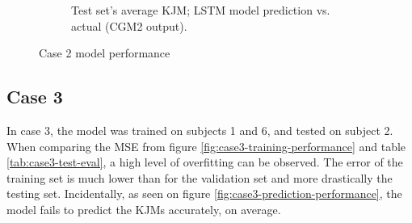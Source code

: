 \documentclass[../main.tex]{subfiles}
\begin{document}
\begin{figure}[!htb]
\begin{subfigure}[b]{0.515\textwidth}
         \label{fig:case2-prediction-performance}
         \caption{Test set's average \ac{KJM}; LSTM model prediction vs. actual (CGM2 output).}
     \end{subfigure}
    \caption{Case 2 model performance}
    \label{fig:case2-performance-plots}
\end{figure}


\subsection{Case 3}
\label{sec:results-case3}
In case 3, the model was trained on subjects 1 and 6, and tested on subject 2.
When comparing the \ac{MSE} from figure \ref{fig:case3-training-performance} and table \ref{tab:case3-test-eval}, a high level of overfitting can be observed.
The error of the training set is much lower than for the validation set and more drastically the testing set.
Incidentally, as seen on figure \ref{fig:case3-prediction-performance}, the model fails to predict the \acp{KJM} accurately, on average.
\end{document}
